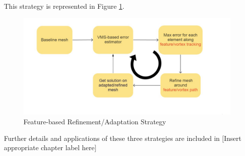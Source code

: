This strategy is represented in Figure \ref{fig:feature_based_strat}.

\begin{figure}[H]
	\centering
	\includegraphics[width=1\textwidth]{figures/adapt_strat/feature_based.png}
	\caption{Feature-based Refinement/Adaptation Strategy}
	\label{fig:feature_based_strat}
\end{figure}

Further details and applications of these three strategies are included in [Insert appropriate chapter label here]




